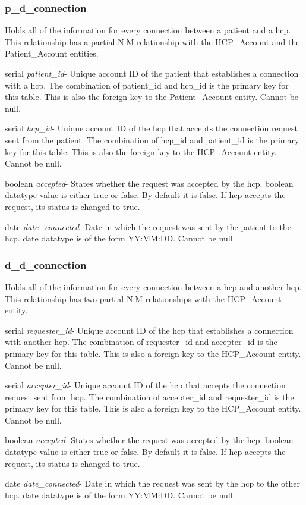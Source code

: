 \documentclass[10pt]{report}
\begin{document}
\subsubsection{p\_d\_connection}
Holds all of the information for every connection between a patient and a hcp.  This relationship has a partial N:M relationship with the HCP\_Account and the Patient\_Account entities.

\begin{description}
\item serial \textit{patient\_id}- Unique account ID of the patient that establishes a connection with a hcp.  The combination of patient\_id and hcp\_id is the primary key for this table.  This is also the foreign key to the Patient\_Account entity.  Cannot be null.
\item serial \textit{hcp\_id}- Unique account ID of the hcp that accepts the connection request sent from the patient.  The combination of hcp\_id and patient\_id is the primary key for this table.  This is also the foreign key to the HCP\_Account entity.  Cannot be null.
\item boolean \textit{accepted}- States whether the request was accepted by the hcp.  boolean datatype value is either true or false.  By default it is false.  If hcp accepts the request, its status is changed to true.
\item date \textit{date\_connected}- Date in which the request was sent by the patient to the hcp.  date datatype is of the form YY:MM:DD.  Cannot be null.
\end{description}

\subsubsection{d\_d\_connection}
Holds all of the information for every connection between a hcp and another hcp.  This relationship has two partial N:M relationships with the HCP\_Account entity.

\begin{description}
\item serial \textit{requester\_id}- Unique account ID of the hcp that establishes a connection with another hcp.  The combination of requester\_id and accepter\_id is the primary key for this table.  This is also a foreign key to the HCP\_Account entity.  Cannot be null.  
\item serial \textit{accepter\_id}- Unique account ID of the hcp that accepts the connection request sent from hcp.  The combination of accepter\_id and requester\_id is the primary key for this table.  This is also a foreign key to the HCP\_Account entity.  Cannot be null.
\item boolean \textit{accepted}- States whether the request was accepted by the hcp.  boolean datatype value is either true or false.  By default it is false.  If hcp accepts the request, its status is changed to true.
\item date \textit{date\_connected}- Date in which the request was sent by the hcp to the other hcp.  date datatype is of the form YY:MM:DD.  Cannot be null.
\end{description}
\end{document}
